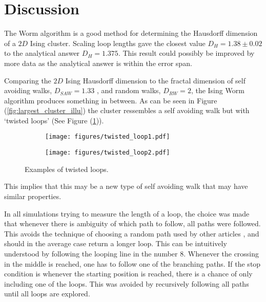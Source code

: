\section{Discussion}
\label{sec:Discussion}

The Worm algorithm is a good method for determining the Hausdorff dimension of a $2D$ Ising cluster. Scaling loop lengths gave the closest value $D_H = 1.38 \pm 0.02$ to the analytical answer $D_H = 1.375$\cite{Duplantier:GeoHausdorff}. This result could possibly be improved by more data as the analytical answer is within the error span.

Comparing the $2D$ Ising Hausdorff dimension to the fractal dimension of self avoiding walks, $D_{SAW} = 1.33$ \cite{Vilgis:FlorySAW}, and random walks, $D_{RW} = 2$, the Ising Worm algorithm produces something in between. As can be seen in Figure (\ref{fig:largest_cluster_illu}) the cluster ressembles a self avoiding walk but with `twisted loops' (See Figure (\ref{fig:twisted_loops})).

\begin{figure}[h!]
\centering
    \begin{subfigure}{.4\textwidth}
        \centering
        \texttt{[image: figures/twisted\_loop1.pdf]}
    \end{subfigure}
    \begin{subfigure}{.4\textwidth}
        \centering
        \texttt{[image: figures/twisted\_loop2.pdf]}
    \end{subfigure}
    \caption{Examples of twisted loops.}
\label{fig:twisted_loops}
\end{figure}

This implies that this may be a new type of self avoiding walk that may have similar properties.

In all simulations trying to measure the length of a loop, the choice was made that whenever there is ambiguity of which path to follow, all paths were followed. This avoids the technique of choosing a random path used by other articles \cite{Hove:hausdorff_crit_fluctuations}, and should in the average case return a longer loop. This can be intuitively understood by following the looping line in the number $8$. Whenever the crossing in the middle is reached, one has to follow one of the branching paths. If the stop condition is whenever the starting position is reached, there is a chance of only including one of the loops. This was avoided by recursively following all paths until all loops are explored.

